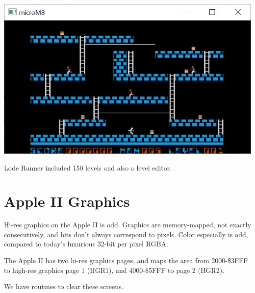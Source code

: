 \documentclass[10pt]{report}%
\begin{document}
\begin{center}
\includegraphics[width=\columnwidth]{screen}
\end{center}

Lode Runner included 150 levels and also a level editor.

\chapter{Apple II Graphics}
Hi-res graphics on the Apple II is odd. Graphics are memory-mapped, not exactly
consecutively, and bits don't always correspond to pixels. Color especially is
odd, compared to today's luxurious 32-bit per pixel RGBA.

The Apple II has two hi-res graphics pages, and maps the area from {\Tt{}{\$}2000-{\$}3FFF\nwendquote} to
high-res graphics page 1 (HGR1), and {\Tt{}{\$}4000-{\$}5FFF\nwendquote} to page 2 (HGR2).

We have routines to clear these screens.
\end{document}
